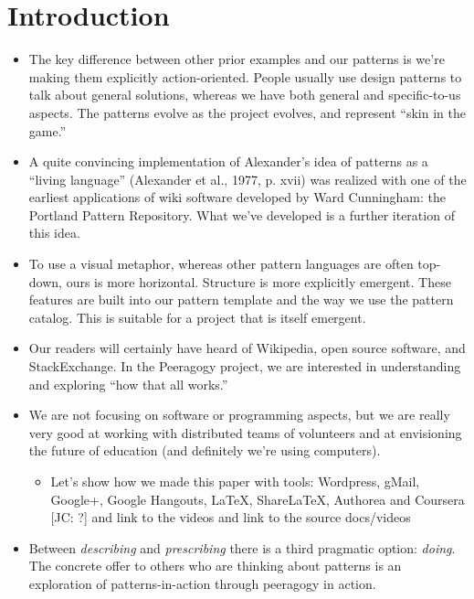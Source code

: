 \section{Introduction}

\begin{itemize}
\item The key difference between other prior examples and our
patterns is we're making them explicitly action-oriented.  People usually use design patterns to talk about general
solutions, whereas we have both general and specific-to-us aspects.
The patterns evolve as the project evolves, and represent ``skin in the game.''
\item A quite convincing implementation of Alexander’s idea of patterns as a “living language” (Alexander et
al., 1977, p. xvii) was realized with one of the earliest applications of wiki
software developed by Ward Cunningham: the Portland Pattern Repository.
What we've developed is a further iteration of this idea.
\item To use a visual metaphor, whereas other pattern languages are often top-down,
ours is more horizontal.  Structure is more explicitly emergent.  These features are built
into our pattern template and the way we use the pattern catalog.  This is suitable for a project
that is itself emergent.
\item Our readers will certainly have heard of Wikipedia, open source
software, and StackExchange.  In the Peeragogy project, we are interested in
understanding and exploring ``how that all works.''
\item We are not focusing on software or programming aspects, but we
are really very good at working with distributed teams of volunteers and
at envisioning the future of education (and definitely we're using
computers).
\begin{itemize}
\item Let's show how we made this paper with tools: Wordpress, gMail, Google+, Google Hangouts, LaTeX, ShareLaTeX, Authorea and Coursera [JC: ?] and link to the videos and link to the source docs/videos
\end{itemize}
\item Between \emph{describing} and \emph{prescribing} there is a third pragmatic option: \emph{doing}.
The concrete offer to others who are thinking about patterns is an exploration of patterns-in-action
through peeragogy in action.
\end{itemize}